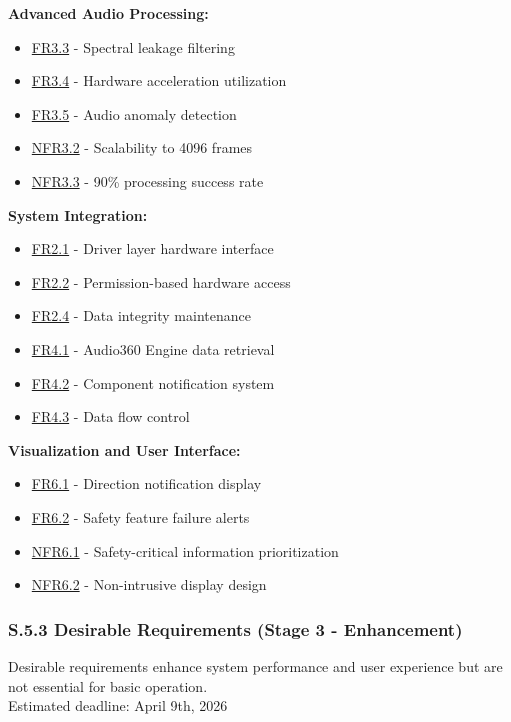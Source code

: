 \documentclass[12pt]{article}
\theoremstyle{definition}
\begin{document}
\textbf{Advanced Audio Processing:}
\begin{itemize}
    \item \hyperref[FR3_3]{FR3.3} - Spectral leakage filtering
    \item \hyperref[FR3_4]{FR3.4} - Hardware acceleration utilization
    \item \hyperref[FR3_5]{FR3.5} - Audio anomaly detection
    \item \hyperref[NFR3_2]{NFR3.2} - Scalability to 4096 frames
    \item \hyperref[NFR3_3]{NFR3.3} - 90\% processing success rate
\end{itemize}

\textbf{System Integration:}
\begin{itemize}
    \item \hyperref[FR2_1]{FR2.1} - Driver layer hardware interface
    \item \hyperref[FR2_2]{FR2.2} - Permission-based hardware access
    \item \hyperref[FR2_4]{FR2.4} - Data integrity maintenance
    \item \hyperref[FR4_1]{FR4.1} - Audio360 Engine data retrieval
    \item \hyperref[FR4_2]{FR4.2} - Component notification system
    \item \hyperref[FR4_3]{FR4.3} - Data flow control
\end{itemize}

\textbf{Visualization and User Interface:}
\begin{itemize}
    \item \hyperref[FR6_1]{FR6.1} - Direction notification display
    \item \hyperref[FR6_2]{FR6.2} - Safety feature failure alerts
    \item \hyperref[NFR6_1]{NFR6.1} - Safety-critical information prioritization
    \item \hyperref[NFR6_2]{NFR6.2} - Non-intrusive display design
\end{itemize}

\subsubsection{S.5.3 Desirable Requirements (Stage 3 - Enhancement)}

Desirable requirements enhance system performance and user experience but are
not essential for basic operation. \\
\newline
Estimated deadline: April 9th, 2026 \\
\newline
\end{document}
